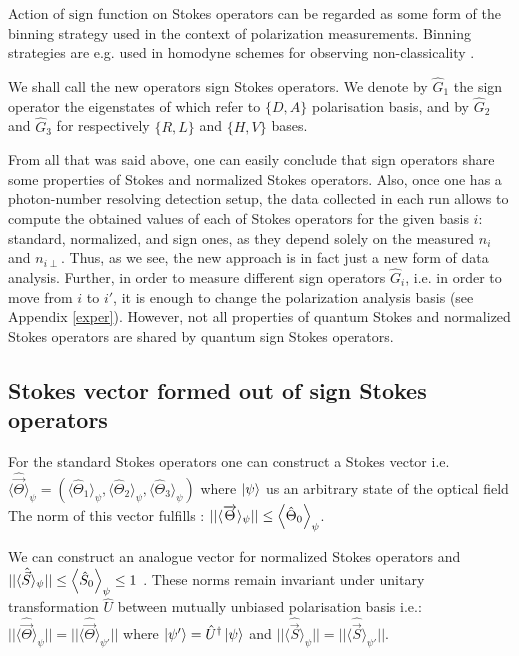 \documentclass[aps,pra, twocolumn, showpacs]{revtex4-2}
\begin{document}
Action of $\mathrm{sign}$ function  on Stokes operators can be regarded as some form of the binning strategy used in the context of polarization measurements. Binning strategies are e.g.
used in homodyne schemes for observing non-classicality \cite{bin1,bin2,bin3,bin4}. 

We shall call the new operators  sign Stokes operators.
We denote by $\hat G_1$ the sign operator the eigenstates of which refer to $\{D,A\}$ polarisation basis, and  by $\hat G_2$ and  $\hat G_3$ for respectively $\{R,L\}$ and $\{H,V\}$ bases.

From all that was  said above, one can easily conclude that
sign  operators
share some  properties of Stokes and normalized Stokes operators. Also, once one has a photon-number resolving detection setup, the data collected in each run  allows to compute the obtained values of each of  Stokes operators for the given basis $i$: standard, normalized, and sign ones, as they depend solely on the measured $n_i$ and $n_{i{\perp}}$. 
Thus, as we see, the new approach is in fact just a new form of data analysis.  
Further, in order to measure different sign operators $\hat G_i$, i.e. in order to move from $i$ to $i'$, it is enough to change the polarization analysis  basis (see Appendix \ref{exper}). 
However, not all properties of quantum Stokes and normalized Stokes operators are shared by quantum sign Stokes operators.

\subsection{Stokes vector formed  out of sign Stokes operators} 

 For the standard Stokes operators one can construct a Stokes vector i.e. $\langle \hat{\overrightarrow{\Theta}}\rangle_\psi=(\langle \hat \Theta_1\rangle_\psi,\langle \hat \Theta_2\rangle_\psi,\langle \hat \Theta_3\rangle_\psi)$ where $\ket{\psi}$ us an arbitrary  state of the optical field              The norm of this vector fulfills : $||\langle \overrightarrow{\Theta}\rangle_\psi||\leq
\expval{\hat \Theta_0}_{\psi}$. 

We can construct an analogue vector for normalized Stokes operators and $||\langle \hat{\vec{S}}\rangle_\psi||\leq
\expval{\hat S_0}_{\psi}\leq 1$ \cite{ZUKUPRA}. 
These  norms remain invariant  under unitary transformation $\hat U$ between mutually unbiased polarisation basis i.e.:
$||\langle \hat {\overrightarrow{\Theta}}\rangle_\psi||=||\langle \hat{\overrightarrow{\Theta}}\rangle_{\psi'}||$
where $\ket{\psi'} = \hat U^\dagger\ket{\psi}$
and  
$||\langle \hat {\overrightarrow{S}}\rangle_\psi||=||\langle \hat{\overrightarrow{S}}\rangle_{\psi'}||$.
\end{document}
